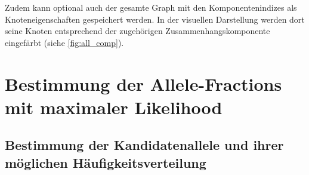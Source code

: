 Zudem kann optional auch der gesamte Graph mit den Komponentenindizes als Knoteneigenschaften gespeichert werden. In der visuellen Darstellung werden dort seine Knoten entsprechend der zugehörigen Zusammenhangskomponente eingefärbt (siehe \autoref{fig:all_comp}).

\section[Bestimmung der Allele-Fraction maximaler Likelihood]{Bestimmung der Allele-Fractions mit maximaler Likelihood} \label{sec:max_lh_allele}
\subsection{Bestimmung der Kandidatenallele und ihrer möglichen Häufigkeitsverteilung} \label{subsec:cand_allele}
